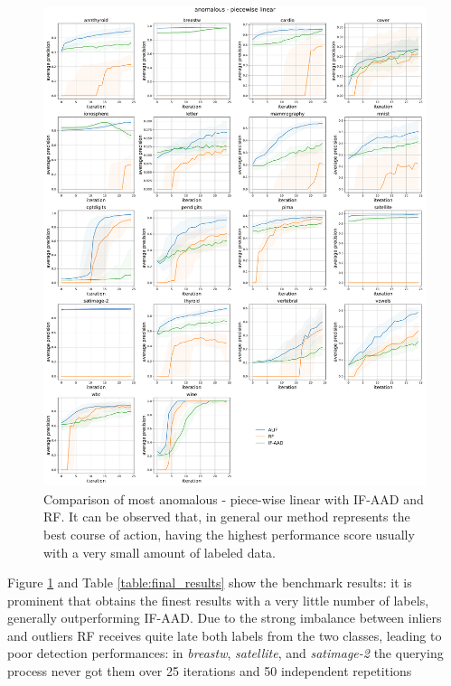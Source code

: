 \begin{figure}
    \centering
    \includegraphics[width=\textwidth]{anomalous_piecewise.pdf}
    \caption{Comparison of most anomalous - piece-wise linear \approach with IF-AAD and RF. It can be observed that, in general our method represents the best course of action, having the highest performance score usually with a very small amount of labeled data.}
    \label{benchmark}
\end{figure}

Figure \ref{benchmark} and Table \ref{table:final_results} show the benchmark results: it is prominent that \approach obtains the finest results with a very little number of labels, generally outperforming IF-AAD. Due to the strong imbalance between inliers and outliers RF receives quite late both labels from the two classes, leading to poor detection performances: in \emph{breastw}, \emph{satellite}, and \emph{satimage-2} the querying process never got them over 25 iterations and 50 independent repetitions %



